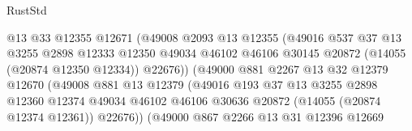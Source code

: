 \begin{lexlean}{RustStd}
\begin{coremodule}
                                    @13
                                    @33
                                    @12355
                                    @12671
                                    (@49008
                                      @2093
                                      @13
                                      @12355
                                      (@49016
                                        @537
                                        @37
                                        @13
                                        @3255
                                        @2898
                                        @12333
                                        @12350
                                        @49034
                                        @46102
                                        @46106
                                        @30145
                                        @20872
                                        (@14055 (@20874 @12350 @12334))
                                        @22676))
                                    (@49000
                                      @881
                                      @2267
                                      @13
                                      @32
                                      @12379
                                      @12670
                                      (@49008
                                        @881
                                        @13
                                        @12379
                                        (@49016
                                          @193
                                          @37
                                          @13
                                          @3255
                                          @2898
                                          @12360
                                          @12374
                                          @49034
                                          @46102
                                          @46106
                                          @30636
                                          @20872
                                          (@14055 (@20874 @12374 @12361))
                                          @22676))
                                      (@49000
                                        @867
                                        @2266
                                        @13
                                        @31
                                        @12396
                                        @12669

\end{coremodule}
\end{lexlean}
